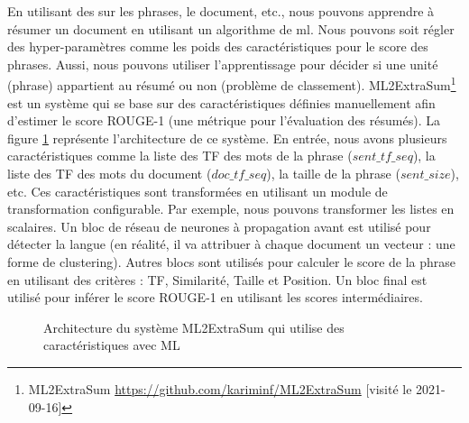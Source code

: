 \documentclass{KodeBook}
\begin{document}
En utilisant des  sur les phrases, le document, etc., nous pouvons apprendre à résumer un document en utilisant un algorithme de \ac{ml}.
Nous pouvons soit régler des hyper-paramètres comme les poids des caractéristiques pour le score des phrases. 
Aussi, nous pouvons utiliser l'apprentissage pour décider si une unité (phrase) appartient au résumé ou non (problème de classement). 
ML2ExtraSum\footnote{ML2ExtraSum \url{https://github.com/kariminf/ML2ExtraSum} [visité le 2021-09-16]} \cite{2020-aries} est un système qui se base sur des caractéristiques définies manuellement afin d'estimer le score ROUGE-1 (une métrique pour l'évaluation des résumés).
La figure \ref{fig:ats-ml2es} représente l'architecture de ce système.
En entrée, nous avons plusieurs caractéristiques comme la liste des TF des mots de la phrase ($sent\_tf\_seq$), la liste des TF des mots du document ($doc\_tf\_seq$), la taille de la phrase ($sent\_size$), etc.
Ces caractéristiques sont transformées en utilisant un module de transformation configurable. 
Par exemple, nous pouvons transformer les listes en scalaires. 
Un bloc de réseau de neurones à propagation avant est utilisé pour détecter la langue (en réalité, il va attribuer à chaque document un vecteur : une forme de clustering).
Autres blocs sont utilisés pour calculer le score de la phrase en utilisant des critères : TF, Similarité, Taille et Position. 
Un bloc final est utilisé pour inférer le score ROUGE-1 en utilisant les scores intermédiaires. 

\begin{figure}[!ht]
	\centering
	\caption[Architecture du système ML2ExtraSum (résumé automatique)]{Architecture du système ML2ExtraSum qui utilise des caractéristiques avec ML \cite{2020-aries}}
	\label{fig:ats-ml2es}
\end{figure}
\end{document}
